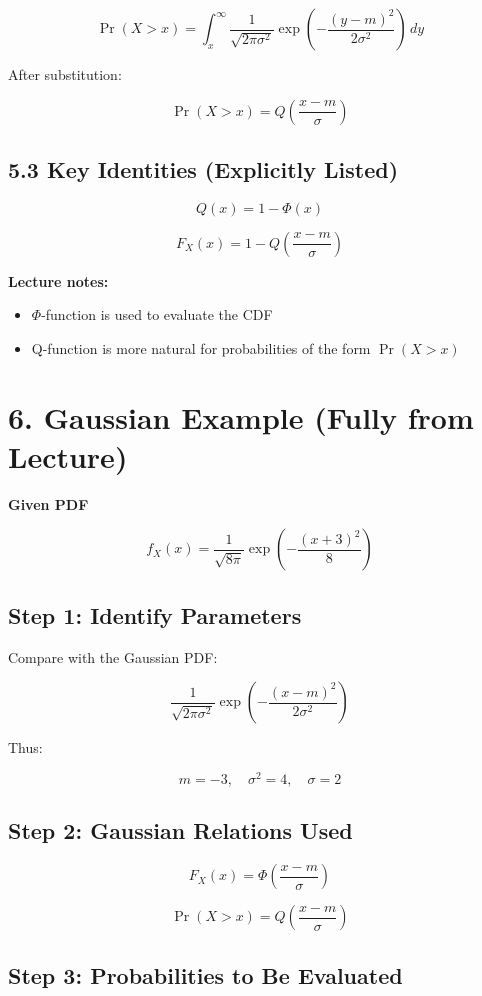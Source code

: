 \documentclass[12pt]{article}
\begin{document}
\[
\Pr(X > x) = \int_{x}^{\infty} \frac{1}{\sqrt{2\pi\sigma^2}} \exp\left(-\frac{(y-m)^2}{2\sigma^2}\right)\, dy
\]

After substitution:

\[
\Pr(X > x) = Q\left(\frac{x-m}{\sigma}\right)
\]

\subsection*{5.3 Key Identities (Explicitly Listed)}

\[
Q(x) = 1 - \Phi(x)
\]

\[
F_X(x) = 1 - Q\left(\frac{x-m}{\sigma}\right)
\]

\textbf{Lecture notes:}
\begin{itemize}
\item $\Phi$-function is used to evaluate the CDF
\item Q-function is more natural for probabilities of the form $\Pr(X > x)$
\end{itemize}

\section*{6. Gaussian Example (Fully from Lecture)}

\textbf{Given PDF}

\[
f_X(x) = \frac{1}{\sqrt{8\pi}} \exp\left(-\frac{(x+3)^2}{8}\right)
\]

\subsection*{Step 1: Identify Parameters}

Compare with the Gaussian PDF:

\[
\frac{1}{\sqrt{2\pi\sigma^2}} \exp\left(-\frac{(x-m)^2}{2\sigma^2}\right)
\]

Thus:

\[
m = -3, \quad \sigma^2 = 4, \quad \sigma = 2
\]

\subsection*{Step 2: Gaussian Relations Used}

\[
F_X(x) = \Phi\left(\frac{x-m}{\sigma}\right)
\]

\[
\Pr(X > x) = Q\left(\frac{x-m}{\sigma}\right)
\]

\subsection*{Step 3: Probabilities to Be Evaluated}
\end{document}
